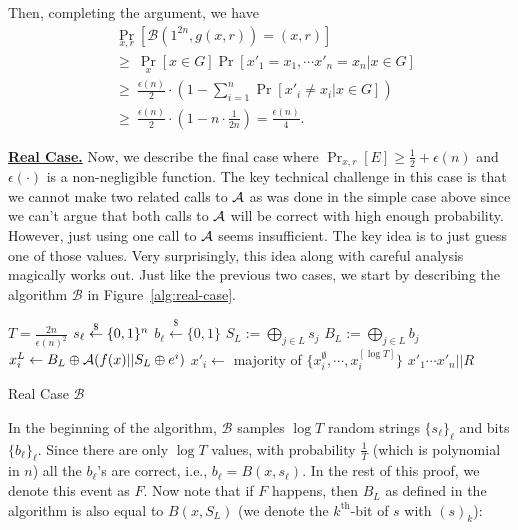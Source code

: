 Then, completing the argument, we have
\begin{align*}
&\Pr_{x,r}[\mathcal{B}(1^{2n}, g(x,r)) = (x,r)]\\
&\geq~ \Pr_x [x \in G] \Pr[x'_1 = x_1, \cdots x'_n = x_n | x \in G]\\
&\geq~ \frac{\epsilon(n)}{2} \cdot \left(1- \sum_{i=1}^n\Pr[x'_i \neq x_i | x \in G]\right)\\
&\geq~ \frac{\epsilon(n)}{2} \cdot \left(1- n \cdot\frac{1}{2n} \right) =  \frac{\epsilon(n)}{4}.
\end{align*}



\bigskip
\noindent\textbf{\underline{Real Case.}} Now, we describe the final case where $\Pr_{x,r}[E] \geq \frac{1}{2} + \epsilon(n)$ and $\epsilon(\cdot)$ is a non-negligible function.
The key technical challenge in this case is that we cannot make two related calls to $\mathcal{A}$ as was done in the simple case above since we can't argue that both calls to $\mathcal{A}$ will be correct with high enough probability.
However, just using one call to $\mathcal{A}$ seems insufficient.
The key idea is to just guess one of those values.
Very surprisingly, this idea along with careful analysis magically works out.
Just like the previous two cases, we start by describing the algorithm $\mathcal{B}$ in Figure~\ref{alg:real-case}.


\begin{marginfigure}
\begin{algorithmic}
\State $T = \frac{2n}{\epsilon(n)^2}$
		\State $s_\ell \stackrel{\$}{\leftarrow} \{0,1\}^{n}$
		\State $b_\ell \stackrel{\$}{\leftarrow} \{0,1\}$
	\EndFor
{}
		\State $S_L :=\bigoplus_{j \in L} s_j$
		\State $B_L := \bigoplus_{j \in L} b_j$
		\State $x_i^L \leftarrow B_L \oplus \mathcal{A}(f(x) || S_L\oplus e^i)$
	\EndFor
	\State $x'_i \gets $ majority of $\{x_i^\emptyset, \cdots, x_i^{[\log T]}\}$
\EndFor
\State \Return $x'_1\cdots x'_n||R$
\end{algorithmic}
\caption{Real Case $\mathcal{B}$} \label{alg:real-case}
\end{marginfigure}

\medskip
In the beginning of the algorithm, $\mathcal{B}$ samples $\log T$ random strings $\{ s_\ell \}_{\ell}$ and bits $\{ b_\ell \}_{\ell}$.
Since there are only $\log T$ values, with probability $\frac{1}{T}$ (which is polynomial in $n$) all the $b_{\ell}$'s are correct, i.e., $b_\ell = B(x, s_\ell)$. In the rest of this proof, we denote this event as $F$.
Now note that if $F$ happens, then $B_L$ as defined in the algorithm is also equal to $B(x, S_L)$ (we denote the $k^{\text{th}}$-bit of $s$ with $(s)_k$): 

